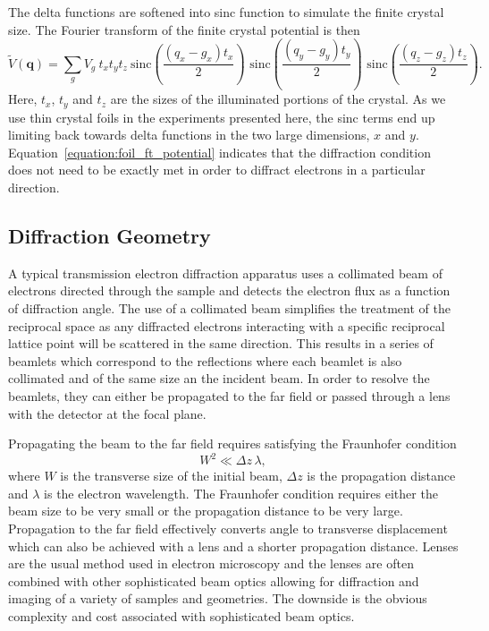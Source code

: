 The delta functions are softened into sinc function to simulate the finite crystal size.
The Fourier transform of the finite crystal potential is then
\begin{equation}\label{equation:foil_ft_potential}
\tilde{V}(\mathbf{q}) = \sum_g V_g \: t_x  t_y  t_z \: \text{sinc}{\left( \frac{(q_x-g_x)t_x}{2} \right)} \,\, \text{sinc}{\left( \frac{(q_y-g_y)t_y}{2} \right)} \,\, \text{sinc}{\left( \frac{(q_z-g_z)t_z}{2} \right)}.
\end{equation}
Here, $t_x$, $t_y$ and $t_z$ are the sizes of the illuminated portions of the crystal.
As we use thin crystal foils in the experiments presented here, the sinc terms end up limiting back towards delta functions in the two large dimensions, $x$ and $y$.
Equation~\ref{equation:foil_ft_potential} indicates that the diffraction condition does not need to be exactly met in order to diffract electrons in a particular direction.

\subsection{Diffraction Geometry}

A typical transmission electron diffraction apparatus uses a collimated beam of electrons directed through the sample and detects the electron flux as a function of diffraction angle.
The use of a collimated beam simplifies the treatment of the reciprocal space as any diffracted electrons interacting with a specific reciprocal lattice point will be scattered in the same direction.
This results in a series of beamlets which correspond to the reflections where each beamlet is also collimated and of the same size an the incident beam.
In order to resolve the beamlets, they can either be propagated to the far field or passed through a lens with the detector at the focal plane.

Propagating the beam to the far field requires satisfying the Fraunhofer condition
\begin{equation}
W^2 \ll \Delta z\,\lambda,
\end{equation}
where $W$ is the transverse size of the initial beam, $\Delta z$ is the propagation distance and $\lambda$ is the electron wavelength.
The Fraunhofer condition requires either the beam size to be very small or the propagation distance to be very large.
Propagation to the far field effectively converts angle to transverse displacement which can also be achieved with a lens and a shorter propagation distance.
Lenses are the usual method used in electron microscopy and the lenses are often combined with other sophisticated beam optics allowing for diffraction and imaging of a variety of samples and geometries.
The downside is the obvious complexity and cost associated with sophisticated beam optics.

